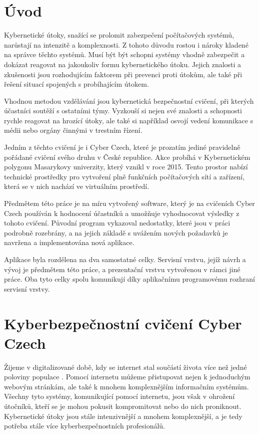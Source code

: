 \documentclass[
  digital, %
  twoside, %
  table,   %
  nolof,     %
  nolot,     %
]{fithesis3}
\begin{document}
\chapter*{Úvod}

Kybernetické útoky, snažící se prolomit zabezpečení počítačových systémů, narůstají na intenzitě a komplexnosti. Z tohoto důvodu rostou i nároky kladené na správce těchto systémů. Musí být být schopni systémy vhodně zabezpečit a dokázat reagovat na jakoukoliv formu kybernetického útoku. Jejich znalosti a zkušenosti jsou rozhodujícím faktorem při prevenci proti útokům, ale také při řešení situací spojených s probíhajícím útokem.

Vhodnou metodou vzdělávání jsou kybernetická bezpečnostní cvičení, při kterých účastníci soutěží s ostatními týmy. Vyzkouší si nejen své znalosti a schopnosti rychle reagovat na hrozící útoky, ale také si například osvojí vedení komunikace s médii nebo orgány činnými v trestním řízení.

Jedním z těchto cvičení je i Cyber Czech, které je prozatím jediné pravidelně pořádané cvičení svého druhu v České republice. \cite{cyberex} Akce probíhá v Kybernetickém polygonu Masarykovy univerzity, který vznikl v roce 2015. Tento prostor nabízí technické prostředky pro vytvoření plně funkčních počítačových sítí a zařízení, která se v nich nachází ve virtuálním prostředí.

Předmětem této práce je na míru vytvořený software, který je na cvičeních Cyber Czech používán k hodnocení účastníků a umožňuje vyhodnocovat výsledky z tohoto cvičení. Původní program vykazoval nedostatky, které jsou v práci podrobně rozebrány, a na jejich základě s uvážením nových požadavků je navržena a implementována nová aplikace. 

Aplikace byla rozdělena na dva samostatné celky. Servisní vrstvu, jejíž návrh a vývoj je předmětem této práce, a prezentační vrstvu vytvořenou v rámci jiné práce. Oba tyto celky spolu komunikují díky aplikačnímu programovému rozhraní servisní vrstvy. 

\chapter{Kyberbezpečnostní cvičení Cyber Czech}

Žijeme v digitalizované době, kdy se internet stal součástí života více než jedné poloviny populace \cite{worldStats}. Pomocí internetu můžeme přistupovat nejen k jednoduchým webovým stránkám, ale také k mnohem komplexnějším informačním systémům. Všechny tyto systémy, komunikující pomocí internetu, jsou však v ohrožení útočníků, kteří se je mohou pokusit kompromitovat nebo do nich proniknout. Kybernetické útoky jsou stále intenzivnější a mnohem komplexnější, a je tedy potřeba stále více kyberbezpečnostních profesionálů. 
\end{document}
